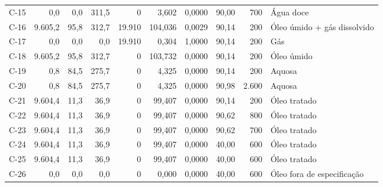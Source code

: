 \documentclass[11pt,a4paper]{article}
\numberwithin{equation}{section}
\numberwithin{table}{section}
\numberwithin{figure}{section}
\begin{document}
{\begin{longtable}{lrrrrrrrrL{2.5cm}}
C-15 & 0,0 & 0,0 & 311,5 & 0 & 3,602 & 0,0000 & 90,00 & 700 & {\scriptsize Água doce}\\
C-16 & 9.605,2 & 95,8 & 312,7 & 19.910 & 104,036 & 0,0029 & 90,14 & 200 & {\scriptsize Óleo úmido + gás dissolvido}\\
C-17 & 0,0 & 0,0 & 0,0 & 19.910 & 0,304 & 1,0000 & 90,14 & 200 & {\scriptsize Gás}\\
C-18 & 9.605,2 & 95,8 & 312,7 & 0 & 103,732 & 0,0000 & 90,14 & 200 & {\scriptsize Óleo úmido}\\
C-19 & 0,8 & 84,5 & 275,7 & 0 & 4,325 & 0,0000 & 90,14 & 200 & {\scriptsize Aquosa}\\
C-20 & 0,8 & 84,5 & 275,7 & 0 & 4,325 & 0,0000 & 90,98 & 2.600 & {\scriptsize Aquosa}\\
C-21 & 9.604,4 & 11,3 & 36,9 & 0 & 99,407 & 0,0000 & 90,14 & 200 & {\scriptsize Óleo tratado}\\
C-22 & 9.604,4 & 11,3 & 36,9 & 0 & 99,407 & 0,0000 & 90,62 & 800 & {\scriptsize Óleo tratado}\\
C-23 & 9.604,4 & 11,3 & 36,9 & 0 & 99,407 & 0,0000 & 90,62 & 700 & {\scriptsize Óleo tratado}\\
C-24 & 9.604,4 & 11,3 & 36,9 & 0 & 99,407 & 0,0000 & 40,00 & 600 & {\scriptsize Óleo tratado}\\
C-25 & 9.604,4 & 11,3 & 36,9 & 0 & 99,407 & 0,0000 & 40,00 & 600 & {\scriptsize Óleo tratado}\\
C-26 & 0,0 & 0,0 & 0,0 & 0 & 0,000 & 0,0000 & 40,00 & 600 & {\scriptsize Óleo fora de especificação}\\
\bottomrule\end{longtable}}
\end{document}
